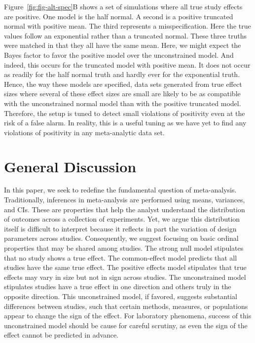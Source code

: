 \documentclass[english,man]{apa6}
\theoremstyle{definition}
\theoremstyle{definition}
\theoremstyle{remark}
\begin{document}
Figure~\ref{fig:fig-alt-spec}B shows a set of simulations where all true
study effects are positive. One model is the half normal. A second is a
positive truncated normal with positive mean. The third represents a
misspecification. Here the true values follow an exponential rather than
a truncated normal. These three truths were matched in that they all
have the same mean. Here, we might expect the Bayes factor to favor the
positive model over the unconstrained model. And indeed, this occurs for
the truncated model with positive mean. It does not occur as readily for
the half normal truth and hardly ever for the exponential truth. Hence,
the way these models are specified, data sets generated from true effect
sizes where several of these effect sizes are small are likely to be as
compatible with the unconstrained normal model than with the positive
truncated model. Therefore, the setup is tuned to detect small
violations of positivity even at the risk of a false alarm. In reality,
this is a useful tuning as we have yet to find any violations of
positivity in any meta-analytic data set.

\section{General Discussion}\label{general-discussion}

In this paper, we seek to redefine the fundamental question of
meta-analysis. Traditionally, inferences in meta-analysis are performed
using means, variances, and CIs. These are properties that help the
analyst understand the distribution of outcomes across a collection of
experiments. Yet, we argue this distribution itself is difficult to
interpret because it reflects in part the variation of design parameters
across studies. Consequently, we suggest focusing on basic ordinal
properties that may be shared among studies. The strong null model
stipulates that no study shows a true effect. The common-effect model
predicts that all studies have the same true effect. The positive
effects model stipulates that true effects may vary in size but not in
sign across studies. The unconstrained model stipulates studies have a
true effect in one direction and others truly in the opposite direction.
This unconstrained model, if favored, suggests substantial differences
between studies, such that certain methods, measures, or populations
appear to change the sign of the effect. For laboratory phenomena,
success of this unconstrained model should be cause for careful
scrutiny, as even the sign of the effect cannot be predicted in advance.
\end{document}

